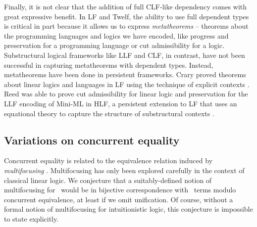 Finally, it is not clear that the addition of full CLF-like dependency
comes with great expressive benefit. 
In LF and Twelf, the ability to use full dependent types is critical
in part because it allows us to express {\it metatheorems} -- theorems
about the programming languages and logics we have encoded, like
progress and preservation for a programming language or cut
admissibility for a logic. Substructural logical frameworks like LLF
and CLF, in contrast, have not been successful in capturing
metatheorems with dependent types. Instead, metatheorems have been
done in persistent frameworks. Crary proved theorems about linear
logics and languages in LF using the technique of explicit contexts
\cite{crary10higher}. Reed was able to prove cut admissibility for
linear logic and preservation for the LLF encoding of Mini-ML in HLF,
a persistent extension to LF that uses an equational theory to capture
the structure of substructural contexts \cite{reed09hybrid}.




\subsection{Variations on concurrent equality}

Concurrent equality is related to the equivalence relation induced by
{\it multifocusing} \cite{chaudhuri08canonical}. Multifocusing has
only been explored carefully in the context of classical linear
logic. We conjecture that a suitably-defined notion of multifocusing
for \ollll~would be in bijective correspondence with \sls~terms modulo
concurrent equivalence, at least if we omit unification. Of course,
without a formal notion of multifocusing for intuitionistic logic, this
conjecture is impossible to state explicitly.


